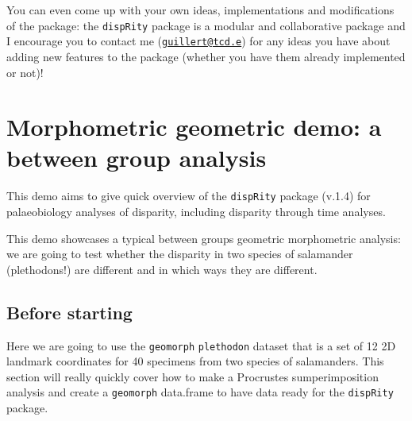 \documentclass[]{book}
\newenvironment{Shaded}{\begin{snugshade}}{\end{snugshade}}
\newcommand{\CommentTok}[1]{\textcolor[rgb]{0.56,0.35,0.01}{\textit{#1}}}
\newcommand{\KeywordTok}[1]{\textcolor[rgb]{0.13,0.29,0.53}{\textbf{#1}}}
\newcommand{\NormalTok}[1]{#1}
\newcommand{\OperatorTok}[1]{\textcolor[rgb]{0.81,0.36,0.00}{\textbf{#1}}}
\newcommand{\StringTok}[1]{\textcolor[rgb]{0.31,0.60,0.02}{#1}}
\begin{document}
You can even come up with your own ideas, implementations and modifications of the package: the \texttt{dispRity} package is a modular and collaborative package and I encourage you to contact me (\href{mailto:guillert@tcd.e}{\nolinkurl{guillert@tcd.e}}) for any ideas you have about adding new features to the package (whether you have them already implemented or not)!

\hypertarget{morphometric-geometric-demo-a-between-group-analysis}{%
\chapter{Morphometric geometric demo: a between group analysis}\label{morphometric-geometric-demo-a-between-group-analysis}}

This demo aims to give quick overview of the \texttt{dispRity} package (v.1.4) for palaeobiology analyses of disparity, including disparity through time analyses.

This demo showcases a typical between groups geometric morphometric analysis: we are going to test whether the disparity in two species of salamander (plethodons!) are different and in which ways they are different.

\hypertarget{before-starting-1}{%
\section{Before starting}\label{before-starting-1}}

Here we are going to use the \texttt{geomorph} \texttt{plethodon} dataset that is a set of 12 2D landmark coordinates for 40 specimens from two species of salamanders.
This section will really quickly cover how to make a Procrustes sumperimposition analysis and create a \texttt{geomorph} data.frame to have data ready for the \texttt{dispRity} package.

\begin{Shaded}
\end{Shaded}
\end{document}
